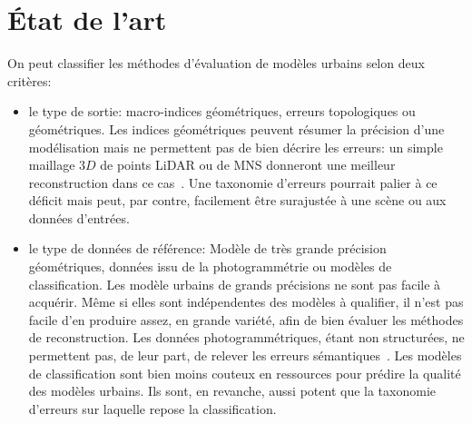 \documentclass[a4paper,french]{article}
\begin{document}
    \section{\'Etat de l'art}
    On peut classifier les méthodes d'évaluation de modèles urbains selon deux critères:
    \begin{itemize}
        \item le type de sortie: macro-indices géométriques, erreurs topologiques ou géométriques. Les indices géométriques peuvent résumer la précision d'une modélisation mais ne permettent pas de bien décrire les erreurs: un simple maillage $3D$ de points LiDAR ou de MNS donneront une meilleur reconstruction dans ce cas~\cite{rottensteiner2014results}. Une taxonomie d'erreurs pourrait palier à ce déficit mais peut, par contre, facilement être surajustée à une scène ou aux données d'entrées.
        \item le type de données de référence: Modèle de très grande précision géométriques, données issu de la photogrammétrie ou modèles de classification. Les modèle urbains de grands précisions ne sont pas facile à acquérir. Même si elles sont indépendentes des modèles à qualifier, il n'est pas facile d'en produire assez, en grande variété, afin de bien évaluer les méthodes de reconstruction. Les données photogrammétriques, étant non structurées, ne permettent pas, de leur part, de relever les erreurs sémantiques~\cite{Akca2010}. Les modèles de classification sont bien moins couteux en ressources pour prédire la qualité des modèles urbains. Ils sont, en revanche, aussi potent que la taxonomie d'erreurs sur laquelle repose la classification.
    \end{itemize}
\end{document}
